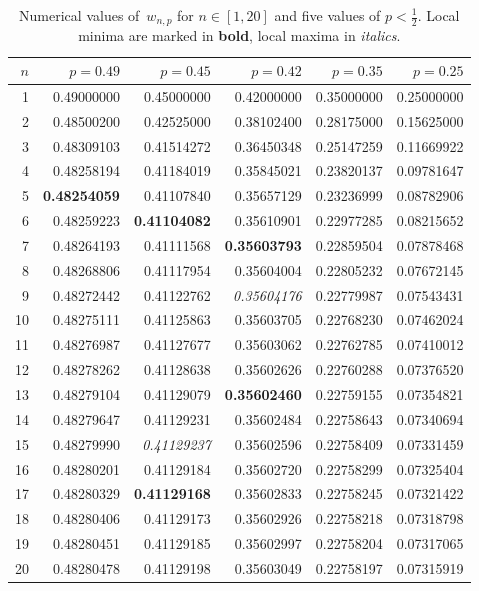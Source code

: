 \documentclass[12pt]{article}
\theoremstyle{definition}
\theoremstyle{remark}
\begin{document}
\begin{table}[h]
\centering
\small
\begin{tabular}{r *{5}{r}}
\toprule
$n$ & $p=0.49$ & $p=0.45$ & $p=0.42$ & $p=0.35$ & $p=0.25$ \\
\midrule
 1 & 0.49000000 & 0.45000000 & 0.42000000 & 0.35000000 & 0.25000000 \\
 2 & 0.48500200 & 0.42525000 & 0.38102400 & 0.28175000 & 0.15625000 \\
 3 & 0.48309103 & 0.41514272 & 0.36450348 & 0.25147259 & 0.11669922 \\
 4 & 0.48258194 & 0.41184019 & 0.35845021 & 0.23820137 & 0.09781647 \\
 5 & \textbf{0.48254059} & 0.41107840 & 0.35657129 & 0.23236999 & 0.08782906 \\
 6 & 0.48259223 & \textbf{0.41104082} & 0.35610901 & 0.22977285 & 0.08215652 \\
 7 & 0.48264193 & 0.41111568 & \textbf{0.35603793} & 0.22859504 & 0.07878468 \\
 8 & 0.48268806 & 0.41117954 & 0.35604004 & 0.22805232 & 0.07672145 \\
 9 & 0.48272442 & 0.41122762 & \textit{0.35604176} & 0.22779987 & 0.07543431 \\
10 & 0.48275111 & 0.41125863 & 0.35603705 & 0.22768230 & 0.07462024 \\
11 & 0.48276987 & 0.41127677 & 0.35603062 & 0.22762785 & 0.07410012 \\
12 & 0.48278262 & 0.41128638 & 0.35602626 & 0.22760288 & 0.07376520 \\
13 & 0.48279104 & 0.41129079 & \textbf{0.35602460} & 0.22759155 & 0.07354821 \\
14 & 0.48279647 & 0.41129231 & 0.35602484 & 0.22758643 & 0.07340694 \\
15 & 0.48279990 & \textit{0.41129237} & 0.35602596 & 0.22758409 & 0.07331459 \\
16 & 0.48280201 & 0.41129184 & 0.35602720 & 0.22758299 & 0.07325404 \\
17 & 0.48280329 & \textbf{0.41129168} & 0.35602833 & 0.22758245 & 0.07321422 \\
18 & 0.48280406 & 0.41129173 & 0.35602926 & 0.22758218 & 0.07318798 \\
19 & 0.48280451 & 0.41129185 & 0.35602997 & 0.22758204 & 0.07317065 \\
20 & 0.48280478 & 0.41129198 & 0.35603049 & 0.22758197 & 0.07315919 \\
\bottomrule
\end{tabular}
\caption{Numerical values of~$w_{n,p}$ for $n\in[1,20]$ and five
  values of $p<\tfrac12$.  Local minima are marked in
  \textbf{bold}, local maxima in \textit{italics}.}\label{tab:w-values}
\end{table}
\end{document}
